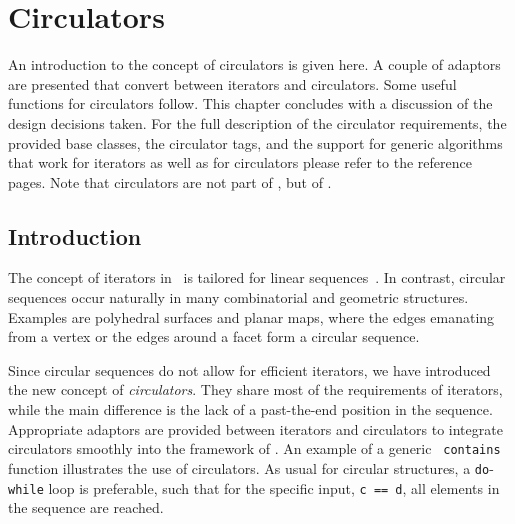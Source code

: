 
\gdef\lciIfHtmlClassLinks{\lcFalse}
\gdef\lciIfHtmlRefLinks{\lcFalse}
\gdef\lciIfHtmlLinks{\lcFalse}

\section{Circulators}


An introduction to the concept of circulators is given here. A couple
of adaptors are presented that convert between iterators and
circulators. Some useful functions for circulators follow. This
chapter concludes with a discussion of the design decisions taken. For
the full description of the circulator requirements, the provided base
classes, the circulator tags, and the support for generic algorithms
that work for iterators as well as for circulators please refer to the
reference pages. Note that circulators are not part of \stl, but of \cgal.

\subsection{Introduction}
\label{sectionIntroduction}
\label{sectionCirculatorWarning}

The concept of iterators in \stl\ is tailored for linear
sequences~\cite{cgal:ansi-is14882-98,cgal:ms-strg-96}.  In contrast, circular
sequences occur naturally in many combinatorial and geometric
structures. Examples are polyhedral surfaces and planar maps, where
the edges emanating from a vertex or the edges around a facet form a
circular sequence.

Since circular sequences do not allow for efficient iterators, we have
introduced the new concept of {\em circulators}. They share most of
the requirements of iterators, while the main difference is the lack
of a past-the-end position in the sequence. Appropriate adaptors are
provided between iterators and circulators to integrate circulators
smoothly into the framework of \stl. An example of a generic {\tt
  contains} function illustrates the use of circulators.  As usual for
circular structures, a {\tt do}-{\tt while} loop is preferable, such
that for the specific input, {\tt c == d}, all elements in the
sequence are reached.


